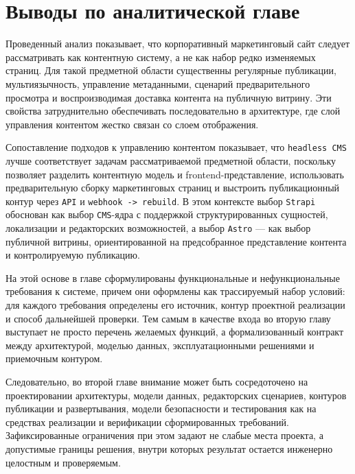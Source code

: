\section{Выводы по аналитической главе}

Проведенный анализ показывает, что корпоративный маркетинговый сайт следует рассматривать
как контентную систему, а не как набор редко изменяемых страниц. Для такой предметной
области существенны регулярные публикации, мультиязычность, управление метаданными,
сценарий предварительного просмотра и воспроизводимая доставка контента на публичную
витрину. Эти свойства затруднительно обеспечивать последовательно в архитектуре, где
слой управления контентом жестко связан со слоем отображения.

Сопоставление подходов к управлению контентом показывает, что \texttt{headless CMS}
лучше соответствует задачам рассматриваемой предметной области, поскольку позволяет
разделить контентную модель и frontend-представление, использовать предварительную сборку
маркетинговых страниц и выстроить публикационный контур через \texttt{API} и
\texttt{webhook -> rebuild}. В этом контексте выбор \texttt{Strapi} обоснован как выбор
\texttt{CMS}-ядра с поддержкой структурированных сущностей, локализации и редакторских
возможностей, а выбор \texttt{Astro} --- как выбор публичной витрины, ориентированной на
предсобранное представление контента и контролируемую публикацию.

На этой основе в главе сформулированы функциональные и нефункциональные требования к
системе, причем они оформлены как трассируемый набор условий: для каждого требования
определены его источник, контур проектной реализации и способ дальнейшей проверки. Тем
самым в качестве входа во вторую главу выступает не просто перечень желаемых функций, а
формализованный контракт между архитектурой, моделью данных, эксплуатационными
решениями и приемочным контуром.

Следовательно, во второй главе внимание может быть сосредоточено на проектировании
архитектуры, модели данных, редакторских сценариев, контуров публикации и развертывания,
модели безопасности и тестирования как на средствах реализации и верификации
сформированных требований. Зафиксированные ограничения при этом задают не слабые места
проекта, а допустимые границы решения, внутри которых результат остается инженерно
целостным и проверяемым.
